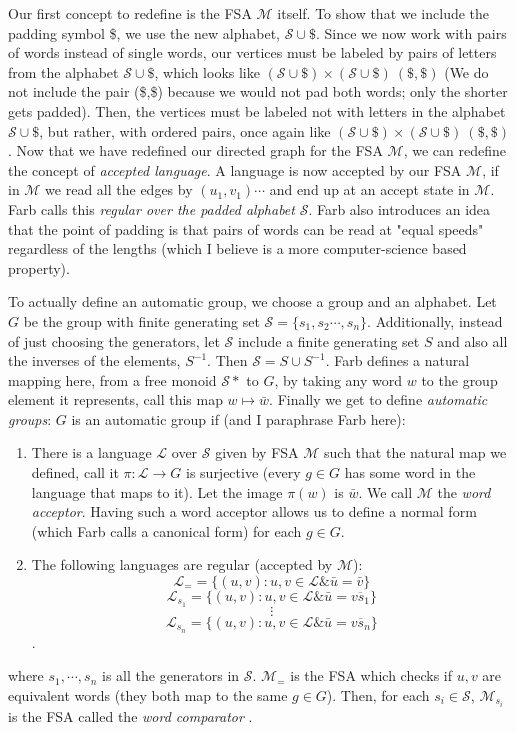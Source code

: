 \documentclass[12pt]{amsart}
\begin{document}
Our first concept to redefine is the FSA $\mathcal{M}$ itself. To show that we include the padding symbol \$, we use the new alphabet, $\mathcal{S}\cup \$$. Since we now work with pairs of words instead of single words, our vertices must be labeled by pairs of letters from the alphabet $\mathcal{S}\cup\$$, which looks like $(\mathcal{S}\cup\$)\times (\mathcal{S}\cup \$) \ (\$,\$)$ (We do not include the pair (\$,\$) because we would not pad both words; only the shorter gets padded). Then, the vertices must be labeled not with letters in the alphabet $\mathcal{S}\cup \$$, but rather, with ordered pairs, once again like $(\mathcal{S}\cup\$)\times (\mathcal{S}\cup \$) \ (\$,\$)$. Now that we have redefined our directed graph for the FSA $\mathcal{M}$, we can redefine the concept of \emph{accepted language}. A language is now accepted by our FSA $\mathcal{M}$, if in $\mathcal{M}$ we read all the edges by $(u_1,v_1)\cdots$ and end up at an accept state in $\mathcal{M}$. Farb calls this \emph{regular over the padded alphabet} $\mathcal{S}$\cite{farb}. Farb also introduces an idea that the point of padding is that pairs of words can be read at "equal speeds" regardless of the lengths (which I believe is a more computer-science based property).

To actually define an automatic group, we choose a group and an alphabet. Let $G$ be the group with finite generating set $\mathcal{S}=\{s_1,s_2\cdots,s_n\}$. Additionally, instead of just choosing the generators, let $\mathcal{S}$ include a finite generating set $S$ and also all the inverses of the elements, $S^{-1}$. Then $\mathcal{S}=S\cup S^{-1}$. Farb defines a natural mapping here, from a free monoid $\mathcal{S}*$ to $G$, by taking any word $w$ to the group element it represents, call this map $w \mapsto \bar{w}$. Finally we get to define \emph{automatic groups}: $G$ is an automatic group if (and I paraphrase Farb here):
\begin{enumerate}
\item There is a language $\mathcal{L}$ over $\mathcal{S}$ given by FSA $\mathcal{M}$ such that the natural map we defined, call it $\pi: \mathcal{L}\rightarrow G$ is surjective (every $g\in G$ has some word in the language that maps to it). Let the image $\pi(w)$ is $\bar{w}$. We call $\mathcal{M}$ the \emph{word acceptor}. Having such a word acceptor allows us to define a normal form (which Farb calls a canonical form) for each $g\in G$.
\item The following languages are regular (accepted by $\mathcal{M}$):
\[\mathcal{L}_= = \{(u,v): u,v \in \mathcal{L} \& \bar{u}=\bar{v}\}\]
\[\mathcal{L}_{s_1} = \{(u,v): u,v \in \mathcal{L} \& \bar{u}=\overline{vs_1}\}\]
\[\vdots\]
\[\mathcal{L}_{s_n} = \{(u,v): u,v \in \mathcal{L} \& \bar{u}=\overline{vs_n}\}\].
\end{enumerate}
where $s_1,\cdots,s_n$ is all the generators in $\mathcal{S}$. $\mathcal{M}_=$ is the FSA which checks if $u,v$ are equivalent words (they both map to the same $g\in G$). Then, for each $s_i\in \mathcal{S}$, $\mathcal{M}_{s_i}$ is the FSA called the \emph{word comparator} \cite{farb}. 
\end{document}
